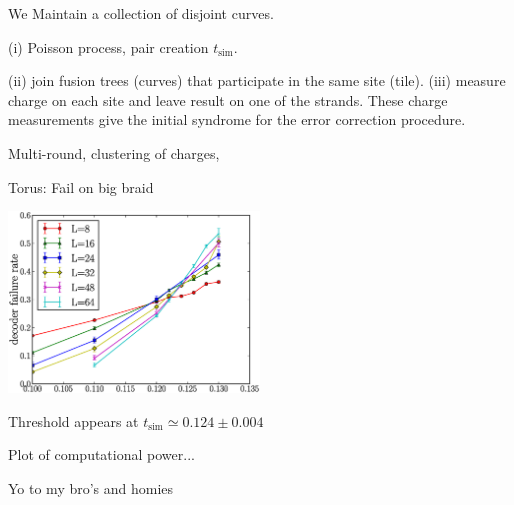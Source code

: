 \documentclass[11pt,a4paper]{article}
\begin{document}
We Maintain a collection of disjoint curves.

(i) Poisson process, pair creation $t_{\mathrm{sim}}$.

(ii) join fusion trees (curves)
that participate in the same site (tile).
(iii) measure charge on each site and leave result on
one of the strands.
These charge measurements give the initial syndrome for the
error correction procedure.

Multi-round, clustering of charges, \cite{Brell13} \cite{Bravyi13}

Torus:
Fail on big braid



\begin{center}
\includegraphics[width=0.5\textwidth]{threshold-graph.eps}
\end{center}

Threshold appears at $t_{\mathrm{sim}}\simeq 0.124 \pm 0.004$

Plot of computational power...





Yo to my bro's and homies


%
\end{document}
